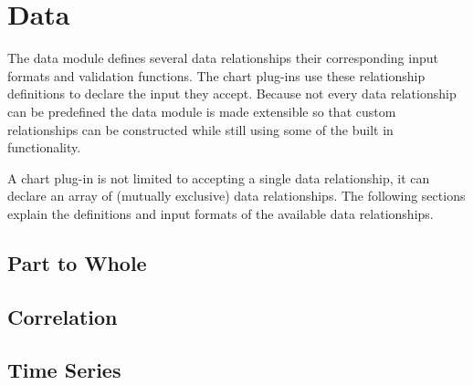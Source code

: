 \section{Data}
The data module defines several data relationships their corresponding input formats and validation functions. The chart plug-ins use these relationship definitions to declare the input they accept. Because not every data relationship can be predefined the data module is made extensible so that custom relationships can be constructed while still using some of the built in functionality.

A chart plug-in is not limited to accepting a single data relationship, it can declare an array of (mutually exclusive) data relationships. The following sections explain the definitions and input formats of the available data relationships.

\subsection{Part to Whole}

\subsection{Correlation}

\subsection{Time Series}

